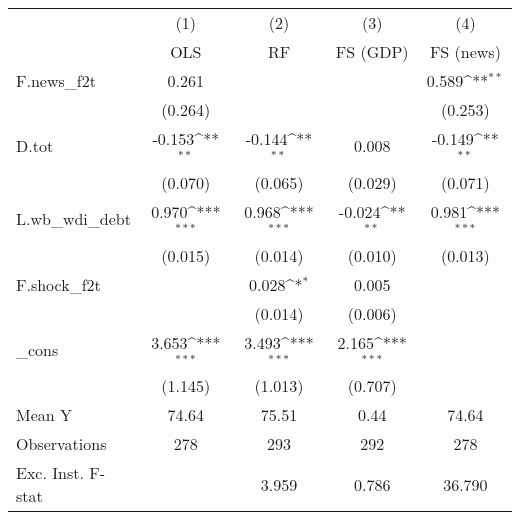 {
\def\sym#1{\ifmmode^{#1}\else\(^{#1}\)\fi}
\begin{tabular}{l*{4}{c}}
\toprule
            &\multicolumn{1}{c}{(1)}&\multicolumn{1}{c}{(2)}&\multicolumn{1}{c}{(3)}&\multicolumn{1}{c}{(4)}\\
            &\multicolumn{1}{c}{OLS}&\multicolumn{1}{c}{RF}&\multicolumn{1}{c}{FS (GDP)}&\multicolumn{1}{c}{FS (news)}\\
\midrule
F.news\_f2t  &       0.261         &                     &                     &       0.589\sym{**} \\
            &     (0.264)         &                     &                     &     (0.253)         \\
\addlinespace
D.tot       &      -0.153\sym{**} &      -0.144\sym{**} &       0.008         &      -0.149\sym{**} \\
            &     (0.070)         &     (0.065)         &     (0.029)         &     (0.071)         \\
\addlinespace
L.wb\_wdi\_debt&       0.970\sym{***}&       0.968\sym{***}&      -0.024\sym{**} &       0.981\sym{***}\\
            &     (0.015)         &     (0.014)         &     (0.010)         &     (0.013)         \\
\addlinespace
F.shock\_f2t &                     &       0.028\sym{*}  &       0.005         &                     \\
            &                     &     (0.014)         &     (0.006)         &                     \\
\addlinespace
\_cons      &       3.653\sym{***}&       3.493\sym{***}&       2.165\sym{***}&                     \\
            &     (1.145)         &     (1.013)         &     (0.707)         &                     \\
\midrule
Mean Y      &       74.64         &       75.51         &        0.44         &       74.64         \\
Observations&         278         &         293         &         292         &         278         \\
Exc. Inst. F-stat&                     &       3.959         &       0.786         &      36.790         \\
\bottomrule
\end{tabular}
}
